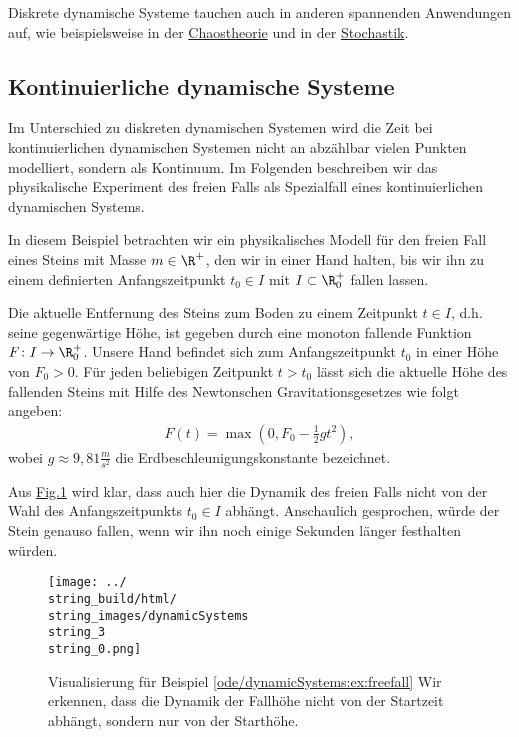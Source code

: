 \documentclass[letterpaper,10pt,english]{jupyterBook}
\begin{document}
Diskrete dynamische Systeme tauchen auch in anderen spannenden Anwendungen auf, wie beispielsweise in der \href{https://de.wikipedia.org/wiki/Bifurkation\_(Mathematik)\#Bifurkationsdiagramm}{Chaostheorie} und in der \href{https://de.wikipedia.org/wiki/Markow-Kette}{Stochastik}.


\subsection{Kontinuierliche dynamische Systeme}
\label{\detokenize{ode/dynamicSystems:kontinuierliche-dynamische-systeme}}
Im Unterschied zu diskreten dynamischen Systemen wird die Zeit bei kontinuierlichen dynamischen Systemen nicht an abzählbar vielen Punkten modelliert, sondern als Kontinuum.
Im Folgenden beschreiben wir das physikalische Experiment des freien Falls als Spezialfall eines kontinuierlichen dynamischen Systems.
\label{ode/dynamicSystems:ex:freefall}
\begin{example}{}{}



In diesem Beispiel betrachten wir ein physikalisches Modell für den freien Fall eines Steins mit Masse \(m \in \R^+\), den wir in einer Hand halten, bis wir ihn zu einem definierten Anfangszeitpunkt \(t_0 \in I\) mit \(I \subset \R^+_0\) fallen lassen.

Die aktuelle Entfernung des Steins zum Boden zu einem Zeitpunkt \(t \in I\), d.h. seine gegenwärtige Höhe, ist gegeben durch eine monoton fallende Funktion \(F \colon I \rightarrow \R^+_0\).
Unsere Hand befindet sich zum Anfangszeitpunkt \(t_0\) in einer Höhe von \(F_0 > 0\).
Für jeden beliebigen Zeitpunkt \(t > t_0\) lässt sich die aktuelle Höhe des fallenden Steins mit Hilfe des Newtonschen Gravitationsgesetzes wie folgt angeben:
\begin{align*}
F(t) = \max(0, F_0 - \frac{1}{2}gt^2),
\end{align*}
wobei \(g \approx 9,81 \frac{m}{s^2}\) die Erdbeschleunigungskonstante bezeichnet.

Aus \hyperref[\detokenize{ode/dynamicSystems:fig-free-fall}]{Fig.\@ \ref{\detokenize{ode/dynamicSystems:fig-free-fall}}} wird klar, dass auch hier die Dynamik des freien Falls nicht von der Wahl des Anfangszeitpunkts \(t_0 \in I\) abhängt.
Anschaulich gesprochen, würde der Stein genauso fallen, wenn wir ihn noch einige Sekunden länger festhalten würden.
\end{example}

\begin{figure}[htbp]
\centering


\noindent\texttt{[image: ../\\string\_build/html/\\string\_images/dynamicSystems\\string\_3\\string\_0.png]}
\caption{Visualisierung für Beispiel \cref{ode/dynamicSystems:ex:freefall}  Wir erkennen, dass die Dynamik der Fallhöhe nicht von der Startzeit abhängt, sondern nur von der Starthöhe.}\label{\detokenize{ode/dynamicSystems:fig-free-fall}}\end{figure}
\end{document}
